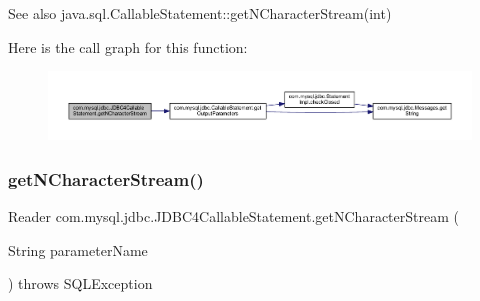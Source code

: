 \begin{DoxySeeAlso}{See also}
java.\+sql.\+Callable\+Statement\+::get\+N\+Character\+Stream(int) 
\end{DoxySeeAlso}
Here is the call graph for this function\+:
\nopagebreak
\begin{figure}[H]
\begin{center}
\leavevmode
\includegraphics[width=350pt]{classcom_1_1mysql_1_1jdbc_1_1_j_d_b_c4_callable_statement_ab6d3df8d45cf6f39eddc72d68d0b9e58_cgraph}
\end{center}
\end{figure}
\mbox{\label{classcom_1_1mysql_1_1jdbc_1_1_j_d_b_c4_callable_statement_ab33ce6e6788ccee8df3cc52bb4e043ec}} 
\subsubsection{\texorpdfstring{get\+N\+Character\+Stream()}{getNCharacterStream()}\hspace{0.1cm}{\footnotesize\ttfamily [2/2]}}
{\footnotesize\ttfamily Reader com.\+mysql.\+jdbc.\+J\+D\+B\+C4\+Callable\+Statement.\+get\+N\+Character\+Stream (\begin{DoxyParamCaption}\item[{String}]{parameter\+Name }\end{DoxyParamCaption}) throws S\+Q\+L\+Exception}

